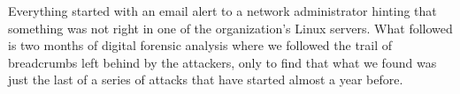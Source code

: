 \def\abstracttitle{Linux Servers Under Siege: a Real Case Forensic Analysis of a Cryptocurrency Miner Attack}
\def\abstractcomment{Regular Talk}
\def\abstractowner{Veronica Valeros}

\thispagestyle{abstract}

Everything started with an email alert to a network administrator hinting that something was not right in one of the organization's Linux servers. What followed is two months of digital forensic analysis where we followed the trail of breadcrumbs left behind by the attackers, only to find that what we found was just the last of a series of attacks that have started almost a year before.
